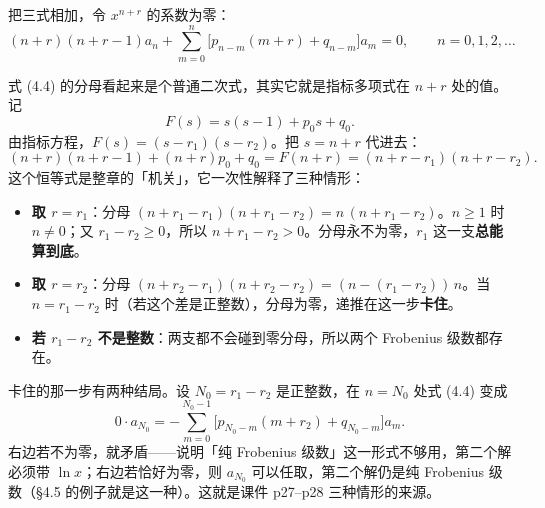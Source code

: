 \documentclass[11pt]{ctexart}
\begin{document}
把三式相加，令 $x^{n+r}$ 的系数为零：
\[
(n+r)(n+r-1)a_n+\sum_{m=0}^{n}\bigl[p_{n-m}(m+r)+q_{n-m}\bigr]a_m=0,
\qquad n=0,1,2,\dots \tag{4.2}
\]





式 (4.4) 的分母看起来是个普通二次式，其实它就是指标多项式在 $n+r$ 处的值。记
\[
F(s)=s(s-1)+p_0s+q_0 .
\]
由指标方程，$F(s)=(s-r_1)(s-r_2)$。把 $s=n+r$ 代进去：
\[
(n+r)(n+r-1)+(n+r)p_0+q_0=F(n+r)=(n+r-r_1)(n+r-r_2). \tag{4.5}
\]
这个恒等式是整章的「机关」，它一次性解释了三种情形：

\begin{itemize}
  \item \textbf{取 $r=r_1$}：分母 $(n+r_1-r_1)(n+r_1-r_2)=n\,(n+r_1-r_2)$。$n\geq1$ 时 $n\neq0$；又 $r_1-r_2\geq0$，所以 $n+r_1-r_2>0$。分母永不为零，$r_1$ 这一支\textbf{总能算到底}。
  \item \textbf{取 $r=r_2$}：分母 $(n+r_2-r_1)(n+r_2-r_2)=(n-(r_1-r_2))\,n$。当 $n=r_1-r_2$ 时（若这个差是正整数），分母为零，递推在这一步\textbf{卡住}。
  \item \textbf{若 $r_1-r_2$ 不是整数}：两支都不会碰到零分母，所以两个 Frobenius 级数都存在。
\end{itemize}

卡住的那一步有两种结局。设 $N_0=r_1-r_2$ 是正整数，在 $n=N_0$ 处式 (4.4) 变成
\[
0\cdot a_{N_0}=-\sum_{m=0}^{N_0-1}\bigl[p_{N_0-m}(m+r_2)+q_{N_0-m}\bigr]a_m .
\]
右边若不为零，就矛盾——说明「纯 Frobenius 级数」这一形式不够用，第二个解必须带 $\ln x$；右边若恰好为零，则 $a_{N_0}$ 可以任取，第二个解仍是纯 Frobenius 级数（§4.5 的例子就是这一种）。这就是课件 p27--p28 三种情形的来源。
\end{document}
